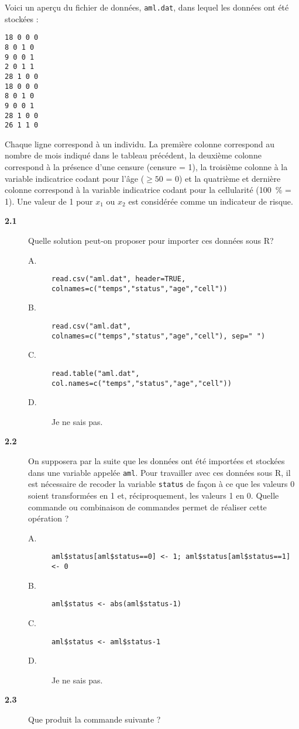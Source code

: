 \documentclass[11pt]{report}
\theoremstyle{definition}
\newcommand{\R}{\textsf{R}\xspace}
\begin{document}
Voici un aperçu du fichier de données, \texttt{aml.dat}, dans lequel les
données ont été stockées :
\begin{verbatim}
18 0 0 0
8 0 1 0
9 0 0 1
2 0 1 1
28 1 0 0
18 0 0 0
8 0 1 0
9 0 0 1
28 1 0 0
26 1 1 0
\end{verbatim}
Chaque ligne correspond à un individu. La première colonne correspond au
nombre de mois indiqué dans le tableau précédent, la deuxième colonne
correspond à la présence d'une censure (censure = 1), la troisième colonne à
la variable indicatrice codant pour l'âge ($\ge 50$ = 0) et la quatrième et
dernière colonne correspond à la variable indicatrice codant pour la
cellularité (100~\% = 1). Une valeur de 1 pour $x_1$ ou $x_2$ est considérée
comme un indicateur de risque.
\begin{description}
\item[\bf 2.1]  Quelle solution peut-on proposer
  pour importer ces données sous \R ?
  \begin{description}
  \item[A.] \verb|read.csv("aml.dat", header=TRUE, colnames=c("temps","status","age","cell"))|
  \item[B.] \verb|read.csv("aml.dat", colnames=c("temps","status","age","cell"), sep=" ")|
  \item[C.] \verb|read.table("aml.dat", col.names=c("temps","status","age","cell"))|
  \item[D.] Je ne sais pas.
  \end{description}
\item[\bf 2.2]  On supposera par la suite que les
  données ont été importées et stockées dans une variable appelée
  \texttt{aml}. Pour travailler avec ces données sous \R, il est nécessaire
  de recoder la variable \texttt{status} de façon à ce que les valeurs 0
  soient transformées en 1 et, réciproquement, les valeurs 1 en 0. Quelle
  commande ou combinaison de commandes permet de réaliser cette opération ?
  \begin{description}
  \item[A.] \verb|aml$status[aml$status==0] <- 1; aml$status[aml$status==1] <- 0|
  \item[B.] \verb|aml$status <- abs(aml$status-1)|
  \item[C.] \verb|aml$status <- aml$status-1|
  \item[D.] Je ne sais pas.
  \end{description}
\item[\bf 2.3]  Que produit la commande suivante ? 

\end{description}
\end{document}
